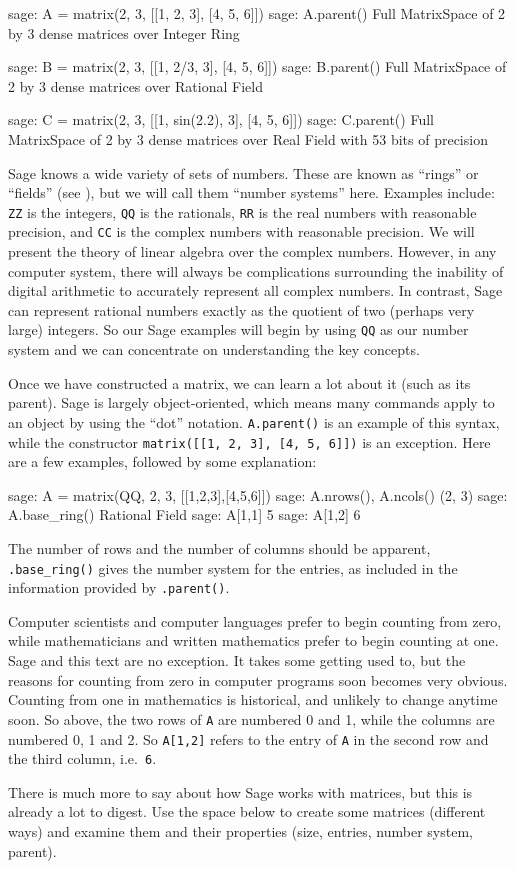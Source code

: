 %
\begin{sageexample}
sage: A = matrix(2, 3, [[1, 2, 3], [4, 5, 6]])
sage: A.parent()
Full MatrixSpace of 2 by 3 dense matrices over Integer Ring
\end{sageexample}
%
\begin{sageexample}
sage: B = matrix(2, 3, [[1, 2/3, 3], [4, 5, 6]])
sage: B.parent()
Full MatrixSpace of 2 by 3 dense matrices over Rational Field
\end{sageexample}
%
\begin{sageexample}
sage: C = matrix(2, 3, [[1, sin(2.2), 3], [4, 5, 6]])
sage: C.parent()
Full MatrixSpace of 2 by 3 dense matrices over
Real Field with 53 bits of precision
\end{sageexample}
%
Sage knows a wide variety of sets of numbers.  These are known as ``rings'' or ``fields'' (see ), but we will call them ``number systems'' here.  Examples include: \verb?ZZ? is the integers, \verb?QQ? is the rationals, \verb?RR? is the real numbers with reasonable precision, and \verb?CC? is the complex numbers with reasonable precision.  We will present the theory of linear algebra over the complex numbers.  However, in any computer system, there will always be complications surrounding the inability of digital arithmetic to accurately represent all complex numbers.  In contrast, Sage can represent rational numbers exactly as the quotient of two (perhaps very large) integers.  So our Sage examples will begin by using \verb?QQ? as our number system and we can concentrate on understanding the key concepts.\par
%
Once we have constructed a matrix, we can learn a lot about it (such as its parent).  Sage is largely object-oriented, which means many commands apply to an object by using the ``dot'' notation.  \verb?A.parent()? is an example of this syntax, while the constructor \verb?matrix([[1, 2, 3], [4, 5, 6]])? is an exception.  Here are a few examples, followed by some explanation:
%
\begin{sageexample}
sage: A = matrix(QQ, 2, 3, [[1,2,3],[4,5,6]])
sage: A.nrows(), A.ncols()
(2, 3)
sage: A.base_ring()
Rational Field
sage: A[1,1]
5
sage: A[1,2]
6
\end{sageexample}
%
The number of rows and the number of columns should be apparent, \verb?.base_ring()? gives the number system for the entries, as included in the information provided by \verb?.parent()?.\par
%
Computer scientists and computer languages prefer to begin counting from zero, while mathematicians and written mathematics prefer to begin counting at one.  Sage and this text are no exception.  It takes some getting used to, but the reasons for counting from zero in computer programs soon becomes very obvious.  Counting from one in mathematics is historical, and unlikely to change anytime soon.  So above, the two rows of \verb?A? are numbered 0 and 1, while the columns are numbered 0, 1 and 2.  So \verb?A[1,2]? refers to the entry of \verb?A? in the second row and the third column, i.e.\ \verb?6?.\par
%
There is much more to say about how Sage works with matrices, but this is already a lot to digest.  Use the space below to create some matrices (different ways) and examine them and their properties (size, entries, number system, parent).
%
\begin{sageverbatim}
\end{sageverbatim}
